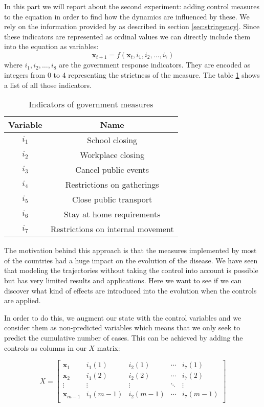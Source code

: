 \documentclass[12pt, letterpaper]{article}
\begin{document}
In this part we will report about the second experiment: adding control measures to the equation in order to find how the dynamics are influenced by these. 
We rely on the information provided by \cite{} as described in section \ref{sec:stringency}.
Since these indicators are represented as ordinal values we can directly include them into the equation as variables: 
$$\mathbf{x}_{t+1} = f(\mathbf{x}_t, i_1, i_2, \dots, i_7)$$
where $i_1, i_2, \dots, i_8$ are the government response indicators. 
They are encoded as integers from 0 to 4 representing the strictness of the measure. The table \ref{tab:stringency} shows a list of all those indicators.


\begin{table}[h!]
\centering
\begin{tabular}{ |c|c| } 
 \hline
 Variable & Name \\ 
 \hline
$i_1$ & School closing \\
$i_2$ & Workplace closing \\
$i_3$ & Cancel public events \\
$i_4$ & Restrictions on gatherings \\
$i_5$ & Close public transport \\ 
$i_6$ & Stay at home requirements \\ 
$i_7$ & Restrictions on internal movement \\

 \hline
\end{tabular}
\caption{Indicators of government measures}
\label{tab:stringency}
\end{table}

The motivation behind this approach is that the measures implemented by most of the countries had a huge impact on the evolution of the disease. 
We have seen that modeling the trajectories without taking the control into account is possible but has very limited results and applications.
Here we want to see if we can discover what kind of effects are introduced into the evolution when the controls are applied.

In order to do this, we augment our state with the control variables and we consider them as non-predicted variables which means that we only seek to predict the cumulative number of cases. 
This can be achieved by adding the controls as columns in our $X$ matrix:

$$X =
\begin{bmatrix}
\mathbf{x}_1 & i_1(1) & i_2(1) & \cdots & i_7(1) \\
\mathbf{x}_2 & i_1(2) & i_2(2) & \cdots & i_7(2) \\
\vdots & \vdots & \vdots & \ddots & \vdots \\
\mathbf{x}_{m-1} & i_1(m-1) & i_2(m-1) & \cdots & i_7(m-1) \\
\end{bmatrix}
$$
\end{document}
